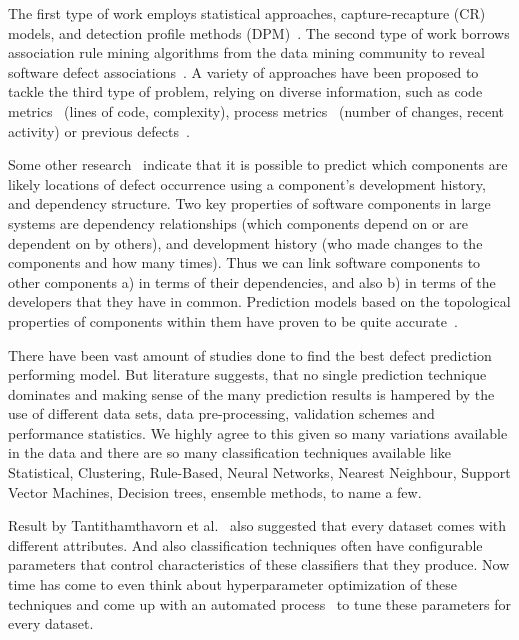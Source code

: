 \documentclass[conference]{IEEEtran}
\begin{document}
The first type of work employs statistical approaches, capture-recapture (CR) models,
and detection profile methods (DPM)~\cite{song2011general}. The second type of work borrows association rule mining
algorithms from the data mining community to reveal software defect associations~\cite{song2006software}. A variety of approaches have been proposed to tackle the third type of problem, relying on diverse information, such as code metrics~\cite{nagappan2006mining} (lines of code, complexity), process metrics~\cite{hassan2009predicting} (number of changes, recent activity) or previous defects~\cite{kim2007predicting}.

Some other research~\cite{bird2009putting} indicate that it is possible to predict which components are likely locations of
defect occurrence using a component’s development history,
and dependency structure. Two key properties of software components
in large systems are dependency relationships (which components
depend on or are dependent on by others), and development
history (who made changes to the components and
how many times). Thus we can link software components
to other components a) in terms of their dependencies, and
also b) in terms of the developers that they have in common. Prediction models based on the topological properties
of components within them have proven to be quite
accurate~\cite{zimmermann2008predicting}.

There have been vast amount of studies done to find the best defect prediction performing model. But literature suggests, that no single prediction technique dominates and making sense of the many prediction results is hampered by the use of different data sets, data pre-processing, validation schemes and performance
statistics. We highly agree to this given so many variations available in the data and there are so many classification techniques available like Statistical, Clustering, Rule-Based, Neural Networks, Nearest Neighbour, Support Vector Machines, Decision trees, ensemble methods, to name a few.

Result by Tantithamthavorn et al.~\cite{tantithamthavorn2016automated} also suggested that every dataset comes with different attributes. And also classification techniques often have configurable parameters
that control characteristics of these classifiers that they produce. Now time has come to even think about hyperparameter optimization of these techniques and come up with an automated process~\cite{fu2016tuning,agrawal2016wrong} to tune these parameters for every dataset.
\end{document}
